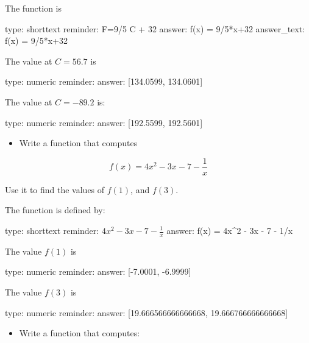 \documentclass[12pt]{article}
\begin{document}
The function is

\begin{answer}
type: shorttext
reminder: F=9/5 C + 32
answer: f(x) = 9/5*x+32
answer_text: f(x) =  9/5*x+32 
\end{answer}

The value at $C=56.7$ is

\begin{answer}
    type: numeric
    reminder: 
    answer: [134.0599, 134.0601]

\end{answer}

The value at $C=-89.2$ is:

\begin{answer}
    type: numeric
    reminder: 
    answer: [192.5599, 192.5601]

\end{answer}

\begin{itemize}
\itemsep1pt\parskip0pt
\item
  Write a function that computes
\end{itemize}

\[
f(x) = 4x^2 - 3x  - 7 - \frac{1}{x}
\]

Use it to find the values of $f(1)$, and $f(3)$.

The function is defined by:

\begin{answer}
type: shorttext
reminder: \( 4x^2 - 3x  - 7 - \frac{1}{x} \)
answer: f(x) = 4x^2 - 3x  - 7 - 1/x

\end{answer}

The value $f(1)$ is

\begin{answer}
    type: numeric
    reminder: 
    answer: [-7.0001, -6.9999]

\end{answer}

The value $f(3)$ is

\begin{answer}
    type: numeric
    reminder: 
    answer: [19.666566666666668, 19.666766666666668]

\end{answer}

\begin{itemize}
\itemsep1pt\parskip0pt
\item
  Write a function that computes:
\end{itemize}
\end{document}
